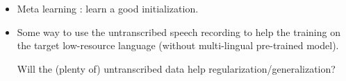 \documentclass{article}
\begin{document}
\begin{itemize}

\item Meta learning \cite{Gu2018}: learn a good initialization.

\item Some way to use the untranscribed speech recording to help the training on the target low-resource language (without multi-lingual pre-trained model).

Will the (plenty of) untranscribed data help regularization/generalization?

\end{itemize}











\end{document}
